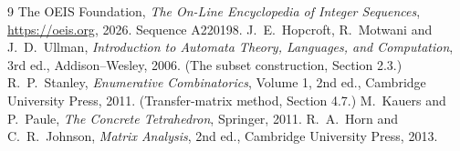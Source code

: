 \documentclass[11pt,a4paper]{article}
\theoremstyle{plain}
\theoremstyle{definition}
\begin{document}
\begin{thebibliography}{9}
 The OEIS Foundation, \emph{The On-Line Encyclopedia of Integer
Sequences}, \url{https://oeis.org}, 2026. Sequence A220198.
 J.~E.~Hopcroft, R.~Motwani and J.~D.~Ullman, \emph{Introduction to Automata
Theory, Languages, and Computation}, 3rd ed., Addison--Wesley, 2006. (The subset
construction, Section 2.3.)
 R.~P.~Stanley, \emph{Enumerative Combinatorics}, Volume 1, 2nd ed.,
Cambridge University Press, 2011. (Transfer-matrix method, Section 4.7.)
 M.~Kauers and P.~Paule, \emph{The Concrete Tetrahedron}, Springer, 2011.
 R.~A.~Horn and C.~R.~Johnson, \emph{Matrix Analysis}, 2nd ed., Cambridge
University Press, 2013.
\end{thebibliography}
\end{document}
